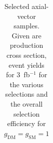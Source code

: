 \begin{table}[h!]
\begin{tabular}{lllllll}
\hline
\hline
\end{tabular}
\caption{Selected axial-vector samples. Given are production cross section, event yields for 3~fb$^{-1 }$ for the various selections and the overall selection efficiency for $g_\textrm{DM}=g_\textrm{SM}=1$}
\label{tab:dm_A_g1_3fb}
\end{table}


